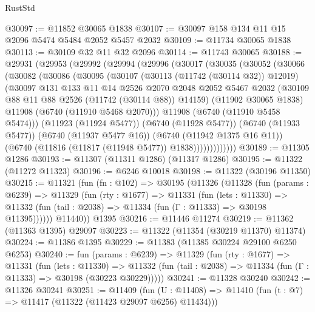 \begin{lexlean}{RustStd}
\begin{coremodule}
@30097 := @11852 @30065 @1838
@30107 := @30097 @158 @134 @11 @15 @2096 @5474 @5484 @2052 @5457 @2032
@30109 := @11734 @30065 @1838
@30113 := @30109 @32 @11 @32 @2096
@30114 := @11743 @30065
@30188 := @29931
    (@29953
      (@29992
        (@29994
          (@29996
            (@30017
              (@30035
                (@30052
                  (@30066
                    (@30082
                      (@30086
                        (@30095
                          (@30107
                            (@30113 (@11742 (@30114 @32)) @12019)
                            (@30097
                              @131
                              @133
                              @11
                              @14
                              @2526
                              @2070
                              @2048
                              @2052
                              @5467
                              @2032
                              (@30109 @88 @11 @88 @2526 (@11742 (@30114 @88)) @14159)
                              (@11902 @30065 @1838)
                              @11908
                              (@6740 (@11910 @5468 @2070)))
                            @11908
                            (@6740 (@11910 @5458 @5474)))
                          (@11923 (@11924 @5477))
                          (@6740 (@11928 @5477))
                          (@6740 (@11933 @5477))
                          (@6740 (@11937 @5477 @16))
                          (@6740 (@11942 @1375 @16 @11))
                          (@6740 (@11816 (@11817 (@11948 @5477)) @1838)))))))))))))
@30189 := @11305 @1286
@30193 := @11307 (@11311 @1286) (@11317 @1286)
@30195 := @11322 (@11272 @11323)
@30196 := @6246 @10018
@30198 := @11322 (@30196 @11350)
@30215 := @11321
    (fun (fn : @102) =>
    @30195
      (@11326
        (@11328
          (fun (params : @6239) =>
          @11329
            (fun (rty : @1677) =>
            @11331
              (fun (lets : @11330) =>
              @11332 (fun (tail : @2038) => @11334 (fun (Γ : @11333) => @30198 @11395))))))
        @11440))
    @1395
@30216 := @11446 @11274
@30219 := @11362 (@11363 @1395) @29097
@30223 := @11322 (@11354 (@30219 @11370) @11374)
@30224 := @11386 @1395
@30229 := @11383 (@11385 @30224 @29100 @6250 @6253)
@30240 := fun (params : @6239) =>
  @11329
    (fun (rty : @1677) =>
    @11331
      (fun (lets : @11330) =>
      @11332 (fun (tail : @2038) => @11334 (fun (Γ : @11333) => @30198 (@30223 @30229)))))
@30241 := @11328 @30240
@30242 := @11326 @30241
@30251 := @11409
    (fun (U : @11408) => @11410 (fun (t : @7) => @11417 (@11322 (@11423 @29097 @6256) @11434)))

\end{coremodule}
\end{lexlean}

